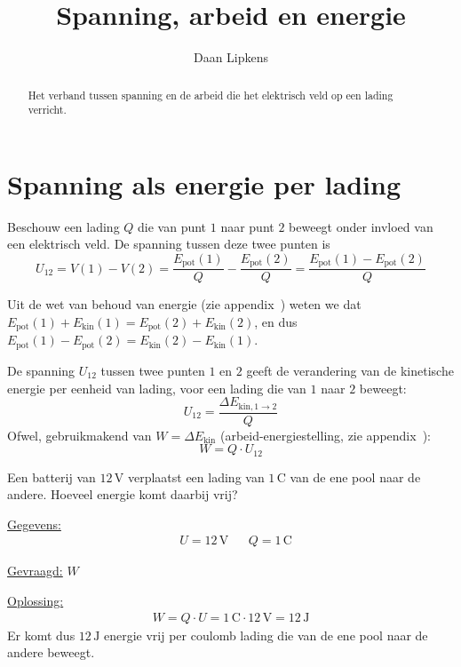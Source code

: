 \documentclass{ximera}
\title{Spanning, arbeid en energie}
\author{Daan Lipkens}
\begin{document}
\begin{abstract}
    Het verband tussen spanning en de arbeid die het elektrisch veld op een lading verricht.
\end{abstract}
\maketitle

\section{Spanning als energie per lading}
Beschouw een lading $Q$ die van punt $1$ naar punt $2$ beweegt onder invloed van een elektrisch veld. De spanning tussen deze twee punten is
\[
    U_{12} = V(1) - V(2) = \frac{E_{\text{pot}}(1)}{Q} - \frac{E_{\text{pot}}(2)}{Q} = \frac{E_{\text{pot}}(1) - E_{\text{pot}}(2)}{Q}
\]

Uit de wet van behoud van energie (zie appendix~) weten we dat $E_{\text{pot}}(1) + E_{\text{kin}}(1) = E_{\text{pot}}(2) + E_{\text{kin}}(2)$, en dus $E_{\text{pot}}(1) - E_{\text{pot}}(2) = E_{\text{kin}}(2) - E_{\text{kin}}(1)$.

\begin{proposition}[foldable=true,title={Betekenis van de spanning}]\nl
De spanning $U_{12}$ tussen twee punten $1$ en $2$ geeft de verandering van de kinetische energie per eenheid van lading, voor een lading die van $1$ naar $2$ beweegt:
\begin{equation}\label{eq:spanning_energie}
    U_{12} = \frac{\Delta E_{\text{kin}, 1 \to 2}}{Q}
\end{equation}
Ofwel, gebruikmakend van $W = \Delta E_{\text{kin}}$ (arbeid-energiestelling, zie appendix~):
\begin{equation}\label{eq:arbeid_spanning}
    W = Q \cdot U_{12}
\end{equation}
\end{proposition}

\begin{example}[foldable=true,title={Voorbeeld: energie geleverd door een batterij}]\nl
Een batterij van $12 \, \mathrm{V}$ verplaatst een lading van $1 \, \mathrm{C}$ van de ene pool naar de andere. Hoeveel energie komt daarbij vrij?

\begin{solution}\nl
\underline{Gegevens:}
\begin{align*}
    & U = 12 \, \mathrm{V} & & Q = 1 \, \mathrm{C}
\end{align*}

\underline{Gevraagd:} $W$

\underline{Oplossing:}
\begin{align*}
    W = Q \cdot U = 1 \, \mathrm{C} \cdot 12 \, \mathrm{V} = \boxed{12 \, \mathrm{J}}
\end{align*}
Er komt dus $12 \, \mathrm{J}$ energie vrij per coulomb lading die van de ene pool naar de andere beweegt.
\end{solution}
\end{example}
\end{document}
